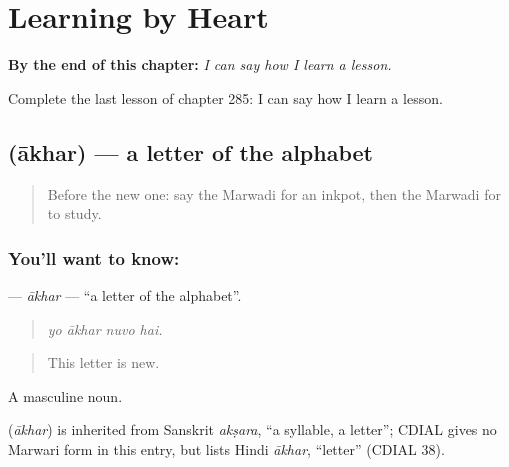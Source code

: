 
\chapter{Learning by Heart}
\label{ch:mw-learning-by-heart}

\begin{chapteropening}
\textbf{By the end of this chapter:} \emph{I can say how I learn a lesson.}

Complete the last lesson of chapter 285: I can say how I learn a lesson.
\end{chapteropening}

\section[\texorpdfstring{\mw{आखर} (ākhar)}{आखर (ākhar)}]{ (ākhar) — a letter of the alphabet}

\label{lesson:MW-C285-akhar}



\begin{quote}
Before the new one: say the Marwadi for an inkpot, then the Marwadi for to study.
\end{quote}

\subsection*{You'll want to know: }
\textbf{} — \emph{ākhar} — \textquotedblleft{}a letter of the alphabet\textquotedblright{}.

\begin{quote}
   
\end{quote}

\begin{quote}
\emph{yo ākhar nuvo hai.}
\end{quote}

\begin{quote}
This letter is new.
\end{quote}

A masculine noun.

\begin{cousinweb}
\textbf{} (\emph{ākhar}) is inherited from Sanskrit \emph{akṣara}, \textquotedblleft{}a syllable, a letter\textquotedblright{}; CDIAL gives no Marwari form in this entry, but lists Hindi \emph{ākhar}, \textquotedblleft{}letter\textquotedblright{} (CDIAL 38).
\end{cousinweb}

